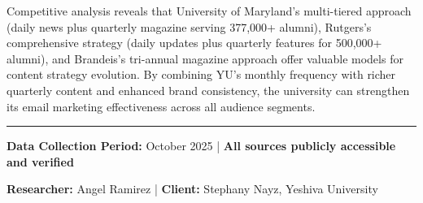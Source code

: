 \documentclass[12pt,letterpaper]{article}
\begin{document}
Competitive analysis reveals that University of Maryland's multi-tiered approach (daily news plus quarterly magazine serving 377,000+ alumni), Rutgers's comprehensive strategy (daily updates plus quarterly features for 500,000+ alumni), and Brandeis's tri-annual magazine approach offer valuable models for content strategy evolution. By combining YU's monthly frequency with richer quarterly content and enhanced brand consistency, the university can strengthen its email marketing effectiveness across all audience segments.

\vspace{0.5cm}

\noindent\rule{\textwidth}{0.4pt}

\textbf{Data Collection Period:} October 2025 | \textbf{All sources publicly accessible and verified}

\textbf{Researcher:} Angel Ramirez | \textbf{Client:} Stephany Nayz, Yeshiva University
\end{document}
